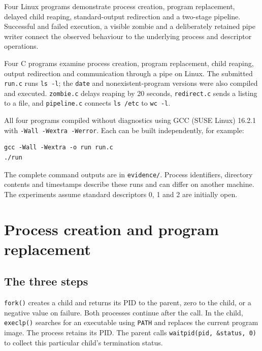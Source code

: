 \documentclass{../latex/utmreport}
\begin{document}
\makeutmreporttitlepage
\tableofcontents
\clearpage
\begin{utmabstract}[Abstract]
Four Linux programs demonstrate process creation, program replacement, delayed child reaping, standard-output redirection and a two-stage pipeline. Successful and failed execution, a visible zombie and a deliberately retained pipe writer connect the observed behaviour to the underlying process and descriptor operations.
\end{utmabstract}
\utmintroduction

Four C programs examine process creation, program replacement, child
reaping, output redirection and communication through a pipe on Linux.
The submitted \texttt{run.c} runs \texttt{ls\ -l}; the \texttt{date} and
nonexistent-program versions were also compiled and executed.
\texttt{zombie.c} delays reaping by 20 seconds, \texttt{redirect.c}
sends a listing to a file, and \texttt{pipeline.c} connects
\texttt{ls\ /etc} to \texttt{wc\ -l}.

All four programs compiled without diagnostics using GCC (SUSE Linux)
16.2.1 with \texttt{-Wall\ -Wextra\ -Werror}. Each can be built
independently, for example:

\begin{lstlisting}
gcc -Wall -Wextra -o run run.c
./run
\end{lstlisting}

The complete command outputs are in \texttt{evidence/}. Process
identifiers, directory contents and timestamps describe these runs and
can differ on another machine. The experiments assume standard
descriptors 0, 1 and 2 are initially open.

\chapter{Process creation and program
replacement}\label{process-creation-and-program-replacement}

\section{The three steps}\label{the-three-steps}

\texttt{fork()} creates a child and returns its PID to the parent, zero
to the child, or a negative value on failure. Both processes continue
after the call. In the child, \texttt{execlp()} searches for an
executable using \texttt{PATH} and replaces the current program image.
The process retains its PID. The parent calls
\texttt{waitpid(pid,\ \&status,\ 0)} to collect this particular child's
termination status.
\end{document}
